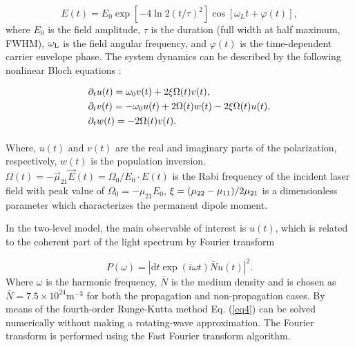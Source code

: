 \documentclass[10pt,letterpaper]{article}
\begin{document}
\begin{equation}
E(t) = {E_0}\exp \left[ { - 4\ln 2{{\left( {t/\tau } \right)}^2}} \right]\cos \left[ {{\omega _L}t + \varphi \left( t \right)} \right],
\label{eq3}
\end{equation}
where $ E_{0} $ is the field amplitude, $ \tau $ is the duration (full width at half maximum, FWHM), $ \omega_{\rm{L}} $ is the field angular frequency, and $ \varphi(t) $ is the time-dependent carrier envelope phase. The system dynamics can be described by the following nonlinear Bloch equations \cite{Ziolkowski-Two-Level-Method-PRA-1995,CuiNi2010NJP-wavelet}:

\begin{equation}
\begin{array}{l}
\smallskip
{\partial _t}u(t) = {\omega _0}v(t) + 2\xi \Omega (t)v(t),\\
\smallskip
{\partial _t}v(t) =  - {\omega _0}u(t) + 2\Omega (t)w(t) - 2\xi \Omega (t)u(t),\\
\smallskip
{\partial _t}w(t) =  - 2\Omega (t)v(t).
\end{array}
\label{eq4}
\end{equation}

Where, $ u(t) $ and $ v(t) $ are the real and imaginary parts of the polarization, respectively, $ w(t) $ is the population inversion. $\Omega\left( t \right) = - \vec{\mu}_{21}\vec{E}\left(t\right)=\Omega_{0}/E_{0}\cdot E\left(t\right)$ is the Rabi frequency of the incident laser field with peak value of ${\Omega _0} =  - {\mu _{21}}{E_0}$, $\xi  = {{\left( {{\mu _{22}} - {\mu _{11}}} \right)} \mathord{\left/{\vphantom {{\left( {{\mu _{22}} - {\mu _{11}}} \right)} {2{\mu _{21}}}}} \right.\kern-\nulldelimiterspace} {2{\mu _{21}}}}$ is a dimensionless parameter which characterizes the permanent dipole moment. 

In the two-level model, the main observable of interest is $u(t)$, which is related to the coherent part of the light spectrum by Fourier transform

\begin{equation}
P(\omega)= \left| \textrm{d}t\exp(i\omega t)\bar{N}u(t)\right|^2.
\label{eq5}
\end{equation}
Where $\omega$ is the harmonic frequency, $ \bar{N} $ is the medium density and is chosen as $ \bar{N}=7.5\times10^{24} \textrm{m}^{-3}$ for both the propagation and non-propagation cases. By means of the fourth-order Runge-Kutta method Eq. (\ref{eq4}) can be solved numerically without making a rotating-wave approximation. The Fourier transform is performed using the Fast Fourier transform algorithm.
\end{document}
